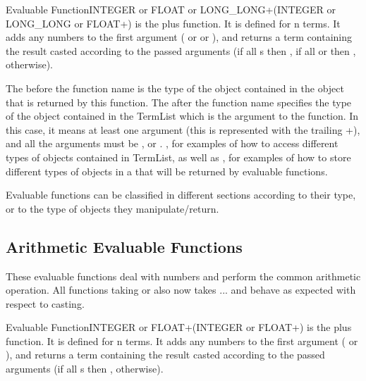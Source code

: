 \begin{typeefa}{Evaluable Function}{INTEGER or FLOAT or
    LONG\_LONG}{+}{({INTEGER or LONG\_LONG or FLOAT}+)} is the plus function.
  It is defined for n terms. It adds any numbers to the first argument
  ( or  or ), and returns a term
  containing the result casted according to the passed arguments (if all
  s then , if all  or
   then ,  otherwise).
\end{typeefa}

The  before the function name \code{+}
is the type of the object contained in the  object that is
returned by this \code{+} function.  The  after the function name specifies the type of the object
contained in the TermList which is the argument to the  function.
In this case, it means at least one argument (this is represented with the
trailing +), and all the arguments must be ,  or
 .  , for examples of how
to access different types of objects contained in TermList, as well as
, for examples of how to
store different types of objects in a  that will be returned by
evaluable functions.

Evaluable functions can be classified in different sections according to their
type, or to the type of objects they manipulate/return.



\subsection{Arithmetic Evaluable Functions}

These evaluable functions deal with numbers and perform the common arithmetic
operation. All functions taking  or  also now
takes ... and behave as expected with respect to casting.

\begin{typeefa}{Evaluable Function}{INTEGER or FLOAT}{+}{({INTEGER or FLOAT}+)}
is the plus function. It is defined for n terms. It adds any numbers to the
first argument ( or ), and returns a term containing
the result casted according to the passed arguments (if all s
then ,  otherwise).
\end{typeefa}

